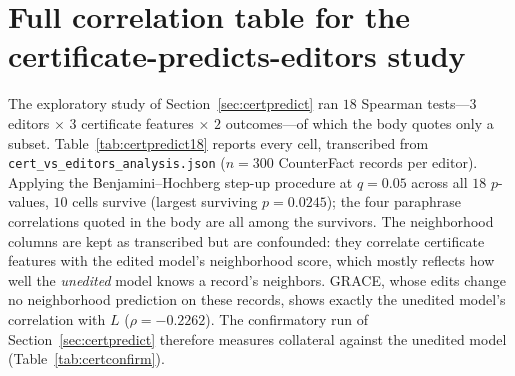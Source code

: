 \documentclass[11pt]{article}
\theoremstyle{remark}
\begin{document}
\section{Full correlation table for the certificate-predicts-editors study}
\label{app:certpredict18}

The exploratory study of Section~\ref{sec:certpredict} ran $18$ Spearman
tests---$3$ editors $\times$ $3$ certificate features $\times$ $2$
outcomes---of which the body quotes only a subset. Table~\ref{tab:certpredict18}
reports every cell, transcribed from
\texttt{cert\_vs\_editors\_analysis.json} ($n=300$ CounterFact records per
editor). Applying the Benjamini--Hochberg step-up procedure at $q=0.05$ across
all $18$ $p$-values, $10$ cells survive (largest surviving $p=0.0245$); the four
paraphrase correlations quoted in the body are all among the survivors. The
neighborhood columns are kept as transcribed but are confounded: they
correlate certificate features with the edited model's neighborhood score,
which mostly reflects how well the \emph{unedited} model knows a record's
neighbors. GRACE, whose edits change no neighborhood prediction on these
records, shows exactly the unedited model's correlation with $L$
($\rho=-0.2262$). The confirmatory run of Section~\ref{sec:certpredict}
therefore measures collateral against the unedited model
(Table~\ref{tab:certconfirm}).
\end{document}
